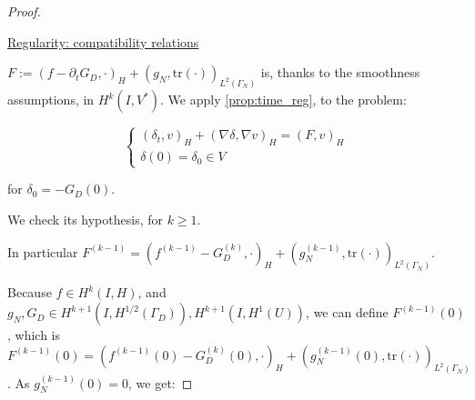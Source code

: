 \documentclass[english,a4paper,10pt,oneside]{scrbook}	%
\theoremstyle{break}
\newenvironment{mproof}[1][\proofname]{%
  \begin{proof}[#1]$ $\par\nobreak\ignorespaces
}{%
  \end{proof}
}
\renewcommand*{\proofname}{Proof}
\theoremstyle{remark}
\newcommand{\norm}[1]{\left\lVert#1\right\rVert}
\newcommand{\tr}{\text{tr}}
\begin{document}
\begin{mproof}
\underline{Regularity: compatibility relations}
%
%
%
%
%
%
%
%
%

$F:=(f-\partial_t G_D, \cdot)_H + (g_N, \tr(\cdot))_{L^2(\Gamma_N)}$ is, thanks to the smoothness assumptions, in $H^k(I,V^*)$. We apply \cref{prop:time_reg}, to the problem:

$$
\left\{\begin{matrix}
(\delta_t,v)_H + (\nabla \delta, \nabla v)_H = (F, v)_H \\
\delta(0) = \delta_0 \in V
\end{matrix}\right.
$$

for $\delta_0 = - G_D(0)$.

We check its hypothesis, for $k\geq 1$.

In particular $F^{(k-1)} = (f^{(k-1)} - G^{(k)}_D, \cdot)_H +(g_N^{(k-1)}, \tr(\cdot))_{L^2(\Gamma_N)}$.

Because $f\in H^k(I,H)$, and $g_N, G_D \in  H^{k+1}(I,H^{1/2}(\Gamma_D)), H^{k+1}(I,H^1(U))$, we can define $F^{(k-1)}(0)$, which is $F^{(k-1)}(0) = (f^{(k-1)}(0) - G^{(k)}_D (0), \cdot)_H +(g_N^{(k-1)}(0), \tr(\cdot))_{L^2(\Gamma_N)}$. As $g_N^{(k-1)}(0) = 0$, we get:


\end{mproof}
\end{document}
